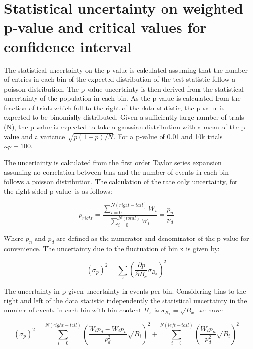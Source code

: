 
%
%

\section{Statistical uncertainty on weighted p-value and critical values for confidence interval}
\label{app:p_value_stat_error}

The statistical uncertainty on the p-value is calculated assuming that the number of entries in each bin of the expected distribution of the test statistic follow a poisson distribution. The p-value uncertainty is then derived from the statistical uncertainty of the population in each bin. As the p-value is calculated from the fraction of trials which fall to the right of the data statistic, the p-value is expected to be binomially distributed. Given a sufficiently large number of trials (N), the p-value is expected to take a gaussian distribution with a mean of the p-value and a variance $\sqrt{p(1-p)/N}$. For a p-value of 0.01 and 10k trials $np = 100$. 

The uncertainty is calculated from the first order Taylor series expansion assuming no correlation between bins and the number of events in each bin follows a poisson distribution. 
The calculation of the rate only uncertainty, for the right sided p-value, is as follows:

\begin{equation}
p_{right} = \frac{ \sum^{N (right-tail)}_{i=0} W_i}{ \sum^{N (total)}_{i=0} W_i}  = \frac{p_n}{p_d}
\end{equation}

Where $p_{n}$ and $p_{d}$ are defined as the numerator and denominator of the p-value for convenience. The uncertainty due to the fluctuation of bin x is given by:

\begin{equation}
(\sigma_p)^2 = \sum_x ( \frac{\partial p}{\partial B_x}  \sigma_{B_x} )^2
\end{equation}

The uncertainty in p given uncertainty in events per bin. Considering bins to the right and left of the data statistic independently the statistical uncertainty in the number of events in each bin with bin content $B_x$ is $\sigma_{B_x} = \sqrt{B_x}$ we have:

\begin{equation}
(\sigma_p)^2 =  \sum^{N (right-tail)}_{i=0}(\frac{ W_i p_d - W_i p_n}{p_d^2} \sqrt{B_i})^2 +  \sum^{N (left-tail)}_{i=0}(\frac{ W_i p_n}{p_d^2} \sqrt{B_i} )^2
\end{equation}

